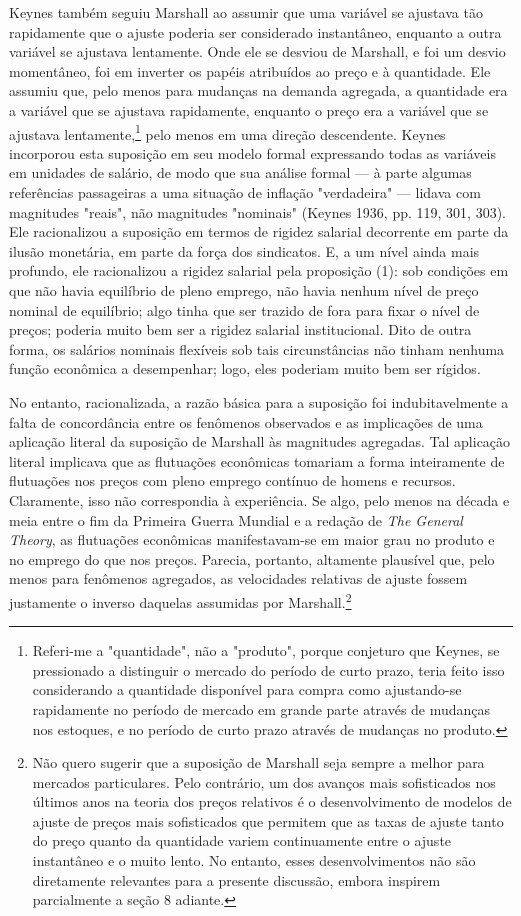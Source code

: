 \documentclass[12pt]{article}
\begin{document}
Keynes também seguiu Marshall ao assumir que uma variável se ajustava tão rapidamente que o ajuste poderia ser considerado instantâneo, enquanto a outra variável se ajustava lentamente. Onde ele se desviou de Marshall, e foi um desvio momentâneo, foi em inverter os papéis atribuídos ao preço e à quantidade. Ele assumiu que, pelo menos para mudanças na demanda agregada, a quantidade era a variável que se ajustava rapidamente, enquanto o preço era a variável que se ajustava lentamente,\footnote{Referi-me a "quantidade", não a "produto", porque conjeturo que Keynes, se pressionado a distinguir o mercado do período de curto prazo, teria feito isso considerando a quantidade disponível para compra como ajustando-se rapidamente no período de mercado em grande parte através de mudanças nos estoques, e no período de curto prazo através de mudanças no produto.} pelo menos em uma direção descendente. Keynes incorporou esta suposição em seu modelo formal expressando todas as variáveis em unidades de salário, de modo que sua análise formal — à parte algumas referências passageiras a uma situação de inflação "verdadeira" — lidava com magnitudes "reais", não magnitudes "nominais" (Keynes 1936, pp. 119, 301, 303). Ele racionalizou a suposição em termos de rigidez salarial decorrente em parte da ilusão monetária, em parte da força dos sindicatos. E, a um nível ainda mais profundo, ele racionalizou a rigidez salarial pela proposição (1): sob condições em que não havia equilíbrio de pleno emprego, não havia nenhum nível de preço nominal de equilíbrio; algo tinha que ser trazido de fora para fixar o nível de preços; poderia muito bem ser a rigidez salarial institucional. Dito de outra forma, os salários nominais flexíveis sob tais circunstâncias não tinham nenhuma função econômica a desempenhar; logo, eles poderiam muito bem ser rígidos.

No entanto, racionalizada, a razão básica para a suposição foi indubitavelmente a falta de concordância entre os fenômenos observados e as implicações de uma aplicação literal da suposição de Marshall às magnitudes agregadas. Tal aplicação literal implicava que as flutuações econômicas tomariam a forma inteiramente de flutuações nos preços com pleno emprego contínuo de homens e recursos. Claramente, isso não correspondia à experiência. Se algo, pelo menos na década e meia entre o fim da Primeira Guerra Mundial e a redação de \textit{The General Theory}, as flutuações econômicas manifestavam-se em maior grau no produto e no emprego do que nos preços. Parecia, portanto, altamente plausível que, pelo menos para fenômenos agregados, as velocidades relativas de ajuste fossem justamente o inverso daquelas assumidas por Marshall.\footnote{Não quero sugerir que a suposição de Marshall seja sempre a melhor para mercados particulares. Pelo contrário, um dos avanços mais sofisticados nos últimos anos na teoria dos preços relativos é o desenvolvimento de modelos de ajuste de preços mais sofisticados que permitem que as taxas de ajuste tanto do preço quanto da quantidade variem continuamente entre o ajuste instantâneo e o muito lento. No entanto, esses desenvolvimentos não são diretamente relevantes para a presente discussão, embora inspirem parcialmente a seção 8 adiante.}
\end{document}
